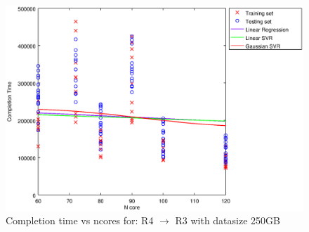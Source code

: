 
\begin {figure}[hbtp]
\centering
\includegraphics[width=\textwidth]{output/R4_R3_250_ALL_FEATURES/plot_R4_R3_250_bestmodels.eps}
\caption{Completion time vs ncores for: R4 $\rightarrow$ R3 with datasize 250GB}
\label{fig:coreonly_linear_R4_R3_250}
\end {figure}
